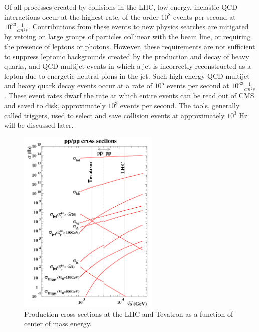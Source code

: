 Of all processes created by collisions in the LHC, low energy, inelastic QCD interactions occur at the highest rate, of the order
$10^{8}$ events per second at $10^{33} \frac{1}{cm^{2}s}$.  Contributions from these events to new physics searches are mitigated by vetoing
on large groups of particles collinear with the beam line, or requiring the presence of leptons or photons.  However, these
requirements are not sufficient to suppress leptonic backgrounds created by the production and decay of heavy quarks, and QCD multijet
events in which a jet is incorrectly reconstructed as a lepton due to energetic neutral pions in the jet.  Such high energy QCD multijet
and heavy quark decay events occur at a rate of $10^{5}$ events per second at $10^{33} \frac{1}{cm^{2}s}$.  These event rates dwarf
the rate at which entire events can be read out of CMS and saved to disk, approximately $10^{3}$ events per second.  The tools, generally
called triggers, used to select and save collision events at approximately $10^{3}$ Hz will be discussed later.

\begin{figure}[h]
	\centering
	\includegraphics[width=0.6\textwidth]{figures/lhc_and_tevatron_cross_sections_2006.png}
	\caption{Production cross sections at the LHC and Tevatron as a function of center of mass energy. \cite{}}
	\label{fig:smProductionXsxns}
\end{figure}


